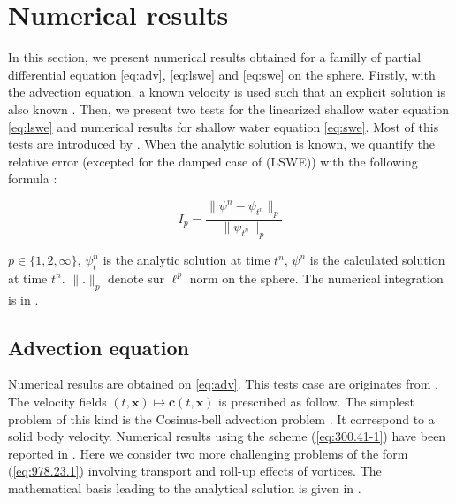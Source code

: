 
\section{Numerical results}

In this section, we present numerical results obtained for a familly of partial differential equation \eqref{eq:adv}, \eqref{eq:lswe} and \eqref{eq:swe} on the sphere. Firstly, with the advection equation, a known velocity is used such that an explicit solution is also known \cite{Nair-Machenhauer, Nair-Jablonowski}. Then, we present two tests for the linearized shallow water equation \eqref{eq:lswe} and numerical results for shallow water equation \eqref{eq:swe}. Most of this tests are introduced by \cite{Williamson-Drake-Hack-Jakob-Swarztrauber, Galewsky-Scott-Polvani}.
When the analytic solution is known, we quantify the relative error (excepted for the damped case of (LSWE)) with the following formula :

\begin{equation}
\label{eq:error1}
I_p = \dfrac{\|\psi^n - \psi_{t^n} \|_p}{\| \psi_{t^n} \|_p}
\end{equation}

$p \in \lbrace 1, 2, \infty \rbrace$, $\psi_t^n$ is the analytic solution at time $t^n$, $\psi^n$ is the calculated solution at time $t^n$. 
$ \| . \| _p$ denote sur $\ell^p$ norm on the sphere. The numerical integration is in \cite{Croisille-12}.

\subsection{Advection equation}

Numerical results are obtained on \eqref{eq:adv}. This tests case are originates from \cite{Nair-Machenhauer, Nair-Jablonowski}. The velocity fields $(t,\mathbf{x}) \mapsto \mathbf{c} ( t,\mathbf{x})$ is prescribed as follow. The simplest problem of this kind is the Cosinus-bell advection problem \cite{Williamson-Drake-Hack-Jakob-Swarztrauber, Galewsky-Scott-Polvani}. It correspond to a solid body velocity. Numerical results using the scheme (\ref{eq:300.41-1}) have been reported in  \cite{Croisille-10}. 
Here we consider two more challenging problems of the form (\ref{eq:978.23.1}) involving transport and roll-up effects of vortices. 
The mathematical basis leading to the analytical solution is given in \cite{Nair-Machenhauer, Nair-Jablonowski}.

